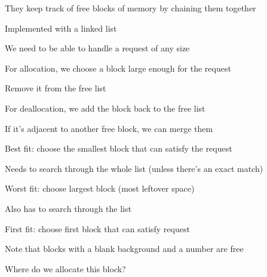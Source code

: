   \begin{slide}


    They keep track of free blocks of memory by chaining them together

    \leftspace{}Implemented with a linked list
    \medskip

    We need to be able to handle a request of any size
    \medskip

    For allocation, we choose a block large enough for the request

    \leftspace{}Remove it from the free list
    \medskip

    For deallocation, we add the block back to the free list

    \leftspace{}If it's adjacent to another free block, we can merge them

  \end{slide}

  \begin{slide}


    Best fit: choose the smallest block that can satisfy the request

    \leftspace{}Needs to search through the whole list (unless there's an
    exact match)
    \medskip

    Worst fit: choose largest block (most leftover space)

    \leftspace{}Also has to search through the list
    \medskip
    
    First fit: choose first block that can satisfy request
  \end{slide}

  \begin{slide}
    

    Note that blocks with a blank background and a number are free
    \medskip


    Where do we allocate this block?
  \end{slide}


